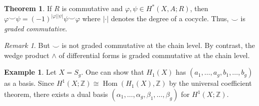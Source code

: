 \documentclass[10pt,letterpaper,cm]{nupset}
\theoremstyle{definition}
\newtheorem{exmp}[definition]{Example}
\theoremstyle{theorem}
\newtheorem{theorem}[definition]{Theorem}
\theoremstyle{remark}
\newtheorem{remark}[definition]{Remark}
\newcommand{\Z}{\mathbb Z}
\newcommand{\1}{\mathbb{1}}
\newcommand{\0}{\vec 0}
\DeclareMathOperator{\Hom}{Hom}
\begin{document}
\begin{theorem}
If $R$ is commutative and $\varphi, \psi \in H^{\ast}(X, A; R)$, then $\varphi \smile \psi = ({-}1)^{|\varphi||\psi|} \psi \smile \varphi$ where $|\cdot|$ denotes the degree of a cocycle. Thus, $\smile$ is \textit{graded commutative}.
\end{theorem}

\begin{remark}
But $\smile$ is not graded commutative at the chain level. By contrast, the wedge product $\wedge$ of differential forms is graded commutative at the chain level. 
\end{remark}

\begin{exmp}
Let $X = S_g$. One can show that $H_1(X)$ has $(a_1, \ldots, a_g, b_1, \ldots, b_g)$ as a basis. Since $H^1(X;\Z) \cong \Hom(H_1(X), \Z)$ by the universal coefficient theorem, there exists a dual basis $(\alpha_1, \ldots, \alpha_g, \beta_1, \ldots, \beta_g)$ for $H^1(X; \Z)$. 


\end{exmp}
\end{document}

